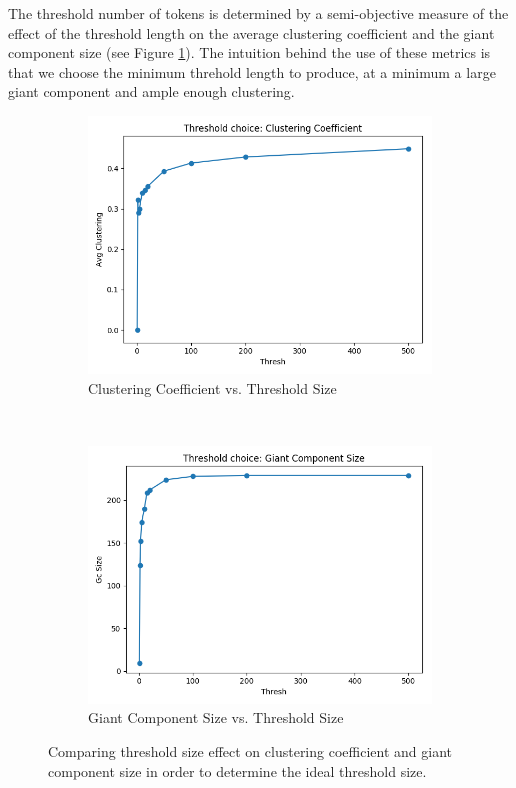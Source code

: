 \documentclass[12pt]{article}
\begin{document}
The threshold number of tokens is determined by a semi-objective measure of the effect of the threshold length on the average clustering coefficient and the giant component size (see Figure \ref{fig-threshold-size}). The intuition behind the use of these metrics is that we choose the minimum threhold length to produce, at a minimum a large giant component and ample enough clustering.


\begin{figure}[h]
	\centering
	\begin{subfigure}{0.4\textwidth}
		\includegraphics[width=1.\textwidth]{data/plots/thresh_vs_avg_clustering.png}
		\caption{Clustering Coefficient vs. Threshold Size}
	\end{subfigure}
	~
	\begin{subfigure}{0.4\textwidth}
		\includegraphics[width=1.\textwidth]{data/plots/thresh_vs_gc_size.png}
		\caption{Giant Component Size vs. Threshold Size}
	\end{subfigure}
	\caption{Comparing threshold size effect on clustering coefficient and giant component size in order to determine the ideal threshold size.}
   	\label{fig-threshold-size}
\end{figure}




\end{document}
